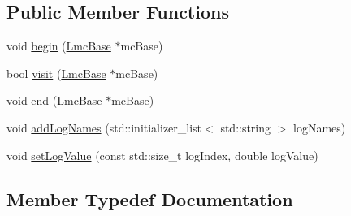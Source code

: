 \subsection*{Public Member Functions}
\begin{DoxyCompactItemize}
\item 
void \hyperlink{classnifty_1_1graph_1_1opt_1_1lifted__multicut_1_1PyLiftedMulticutVisitorBase_a67233e1adc5ab7dc616c76ca42990dca}{begin} (\hyperlink{classnifty_1_1graph_1_1opt_1_1lifted__multicut_1_1PyLiftedMulticutVisitorBase_ab42d6b0fdecfe2dc9232654ce690c923}{Lmc\+Base} $\ast$mc\+Base)
\item 
bool \hyperlink{classnifty_1_1graph_1_1opt_1_1lifted__multicut_1_1PyLiftedMulticutVisitorBase_ab9e6900065799496ae1bd88afee881a4}{visit} (\hyperlink{classnifty_1_1graph_1_1opt_1_1lifted__multicut_1_1PyLiftedMulticutVisitorBase_ab42d6b0fdecfe2dc9232654ce690c923}{Lmc\+Base} $\ast$mc\+Base)
\item 
void \hyperlink{classnifty_1_1graph_1_1opt_1_1lifted__multicut_1_1PyLiftedMulticutVisitorBase_abc9fa6914576a96ef3c261e8a176fffa}{end} (\hyperlink{classnifty_1_1graph_1_1opt_1_1lifted__multicut_1_1PyLiftedMulticutVisitorBase_ab42d6b0fdecfe2dc9232654ce690c923}{Lmc\+Base} $\ast$mc\+Base)
\item 
void \hyperlink{classnifty_1_1graph_1_1opt_1_1lifted__multicut_1_1PyLiftedMulticutVisitorBase_ad7e8835d70def796b71cff0caa79c596}{add\+Log\+Names} (std\+::initializer\+\_\+list$<$ std\+::string $>$ log\+Names)
\item 
void \hyperlink{classnifty_1_1graph_1_1opt_1_1lifted__multicut_1_1PyLiftedMulticutVisitorBase_a3b6820cf08c0cda2cd72fd5627ea8faa}{set\+Log\+Value} (const std\+::size\+\_\+t log\+Index, double log\+Value)
\end{DoxyCompactItemize}


\subsection{Member Typedef Documentation}
\mbox{\label{classnifty_1_1graph_1_1opt_1_1lifted__multicut_1_1PyLiftedMulticutVisitorBase_a9d2428fd2f0972bd1214adb32262f694}} 
